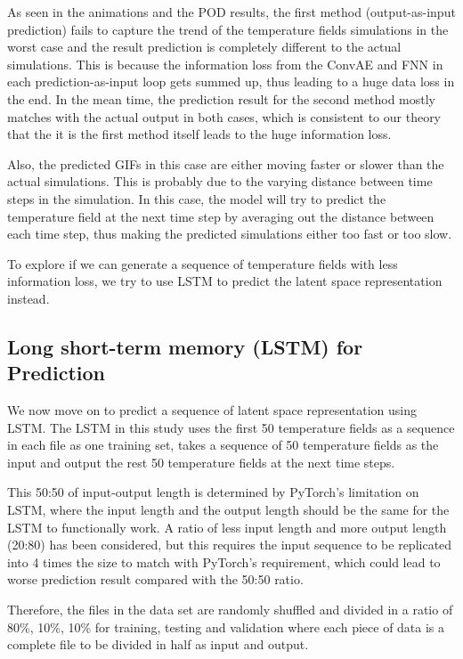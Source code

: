 As seen in the animations and the POD results, the first method (output-as-input prediction) fails to capture the trend of the temperature fields simulations in the worst case and the result prediction is completely different to the actual simulations. This is because the information loss from the ConvAE and FNN in each prediction-as-input loop gets summed up, thus leading to a huge data loss in the end. In the mean time, the prediction result for the second method mostly matches with the actual output in both cases, which is consistent to our theory that the it is the first method itself leads to the huge information loss.

Also, the predicted GIFs in this case are either moving faster or slower than the actual simulations. This is probably due to the varying distance between time steps in the simulation. In this case, the model will try to predict the temperature field at the next time step by averaging out the distance between each time step, thus making the predicted simulations either too fast or too slow.

To explore if we can generate a sequence of temperature fields with less information loss, we try to use LSTM to predict the latent space representation instead.


\subsection{Long short-term memory (LSTM) for Prediction}

We now move on to predict a sequence of latent space representation using LSTM. The LSTM in this study uses the first 50 temperature fields as a sequence in each file as one training set, takes a sequence of 50 temperature fields as the input and output the rest 50 temperature fields at the next time steps.

This 50:50 of input-output length is determined by PyTorch's limitation on LSTM, where the input length and the output length should be the same for the LSTM to functionally work. A ratio of less input length and more output length (20:80) has been considered, but this requires the input sequence to be replicated into 4 times the size to match with PyTorch's requirement, which could lead to worse prediction result compared with the 50:50 ratio.

Therefore, the files in the data set are randomly shuffled and divided in a ratio of 80\%, 10\%, 10\% for training, testing and validation where each piece of data is a complete file to be divided in half as input and output.


